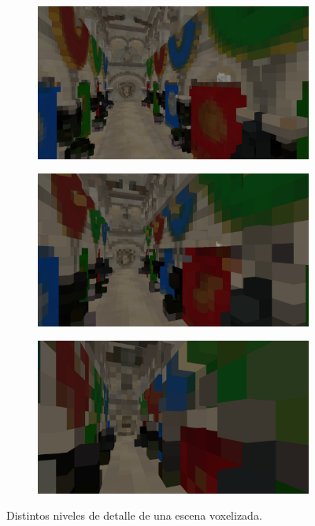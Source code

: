 \begin{figure}[H]
	\centering
	\begin{subfigure}[b]{.32\linewidth}
		\centering
		\captionsetup{justification=centering}
		\includegraphics[width=\linewidth]{media/finals/albedo_v256.png}
	\end{subfigure}%
	\hspace{0.01\textwidth}
	\begin{subfigure}[b]{.32\linewidth}
		\centering
		\captionsetup{justification=centering}
		\includegraphics[width=\linewidth]{media/finals/albedo_v128.png}
	\end{subfigure}%
	\hspace{0.01\textwidth}
	\begin{subfigure}[b]{.32\linewidth}
		\centering
		\captionsetup{justification=centering}
		\includegraphics[width=\linewidth]{media/finals/albedo_v64.png}
	\end{subfigure}%
	\caption{Distintos niveles de detalle de una escena voxelizada.}
	\label{fig:voxelization_details}
\end{figure}

